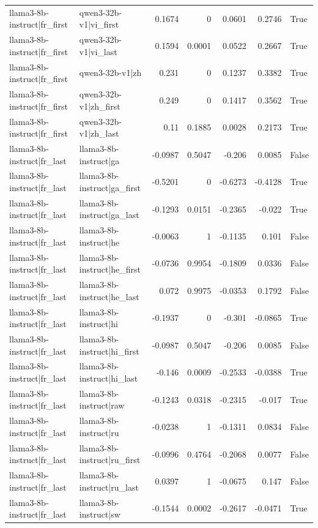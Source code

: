 \begin{table}
\begin{tabular}{l l r r r r l}
llama3-8b-instruct|fr_first & qwen3-32b-v1|vi_first & 0.1674 & 0 & 0.0601 & 0.2746 & True \\
llama3-8b-instruct|fr_first & qwen3-32b-v1|vi_last & 0.1594 & 0.0001 & 0.0522 & 0.2667 & True \\
llama3-8b-instruct|fr_first & qwen3-32b-v1|zh & 0.231 & 0 & 0.1237 & 0.3382 & True \\
llama3-8b-instruct|fr_first & qwen3-32b-v1|zh_first & 0.249 & 0 & 0.1417 & 0.3562 & True \\
llama3-8b-instruct|fr_first & qwen3-32b-v1|zh_last & 0.11 & 0.1885 & 0.0028 & 0.2173 & True \\
llama3-8b-instruct|fr_last & llama3-8b-instruct|ga & -0.0987 & 0.5047 & -0.206 & 0.0085 & False \\
llama3-8b-instruct|fr_last & llama3-8b-instruct|ga_first & -0.5201 & 0 & -0.6273 & -0.4128 & True \\
llama3-8b-instruct|fr_last & llama3-8b-instruct|ga_last & -0.1293 & 0.0151 & -0.2365 & -0.022 & True \\
llama3-8b-instruct|fr_last & llama3-8b-instruct|he & -0.0063 & 1 & -0.1135 & 0.101 & False \\
llama3-8b-instruct|fr_last & llama3-8b-instruct|he_first & -0.0736 & 0.9954 & -0.1809 & 0.0336 & False \\
llama3-8b-instruct|fr_last & llama3-8b-instruct|he_last & 0.072 & 0.9975 & -0.0353 & 0.1792 & False \\
llama3-8b-instruct|fr_last & llama3-8b-instruct|hi & -0.1937 & 0 & -0.301 & -0.0865 & True \\
llama3-8b-instruct|fr_last & llama3-8b-instruct|hi_first & -0.0987 & 0.5047 & -0.206 & 0.0085 & False \\
llama3-8b-instruct|fr_last & llama3-8b-instruct|hi_last & -0.146 & 0.0009 & -0.2533 & -0.0388 & True \\
llama3-8b-instruct|fr_last & llama3-8b-instruct|raw & -0.1243 & 0.0318 & -0.2315 & -0.017 & True \\
llama3-8b-instruct|fr_last & llama3-8b-instruct|ru & -0.0238 & 1 & -0.1311 & 0.0834 & False \\
llama3-8b-instruct|fr_last & llama3-8b-instruct|ru_first & -0.0996 & 0.4764 & -0.2068 & 0.0077 & False \\
llama3-8b-instruct|fr_last & llama3-8b-instruct|ru_last & 0.0397 & 1 & -0.0675 & 0.147 & False \\
llama3-8b-instruct|fr_last & llama3-8b-instruct|sw & -0.1544 & 0.0002 & -0.2617 & -0.0471 & True \\

\end{tabular}
\end{table}
